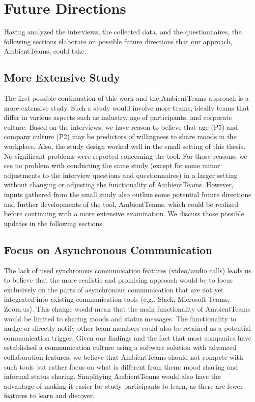 \chapter{Future Directions}
Having analyzed the interviews, the collected data, and the questionnaires, the following sections elaborate on possible future directions that our approach, AmbientTeams, could take.

\label{chapter:future_directions}

\section{More Extensive Study}
The first possible continuation of this work and the AmbientTeams approach is a more extensive study. Such a study would involve more teams, ideally teams that differ in various aspects such as industry, age of participants, and corporate culture. Based on the interviews, we have reason to believe that age (P5) and company culture (P2) may be predictors of willingness to share moods in the workplace. Also, the study design worked well in the small setting of this thesis. No significant problems were reported concerning the tool. For those reasons, we see no problem with conducting the same study (except for some minor adjustments to the interview questions and questionnaires) in a larger setting without changing or adjusting the functionality of AmbientTeams. However, inputs gathered from the small study also outline some potential future directions and further developments of the tool, AmbientTeams, which could be realized before continuing with a more extensive examination. We discuss those possible updates in the following sections.


\section{Focus on Asynchronous Communication}
The lack of used synchronous communication features (video/audio calls) leads us to believe that the more realistic and promising approach would be to focus exclusively on the parts of asynchronous communication that are not yet integrated into existing communication tools (e.g., Slack, Microsoft Teams, Zoom.us). This change would mean that the main functionality of AmbientTeams would be limited to sharing moods and status messages. The functionality to nudge or directly notify other team members could also be retained as a potential communication trigger. Given our findings and the fact that most companies have established a communication culture using a software solution with advanced collaboration features, we believe that AmbientTeams should not compete with such tools but rather focus on what is different from them: mood sharing and informal status sharing. Simplifying AmbientTeams would also have the advantage of making it easier for study participants to learn, as there are fewer features to learn and discover.


